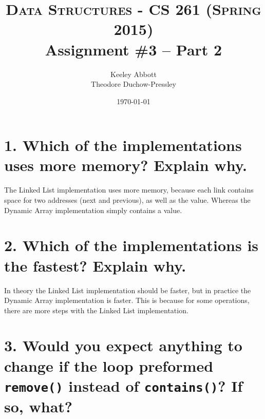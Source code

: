 \documentclass[letter,11pt]{scrartcl}
\title{
  \normalfont \normalsize
  \textsc{Data Structures - CS 261 (Spring 2015)} \\
  \huge Assignment \#3 -- Part 2
}
\author{Keeley Abbott
\\ Theodore Duchow-Pressley}
\date{\normalsize\today}
\begin{document}
\maketitle


\section*{1. Which of the implementations uses more memory? Explain why.}

The Linked List implementation uses more memory, because each link contains
space for two addresses (next and previous), as well as the value. Whereas the
Dynamic Array implementation simply contains a value.


\section*{2. Which of the implementations is the fastest? Explain why.}

In theory the Linked List implementation should be faster, but in practice the
Dynamic Array implementation is faster. This is because for some operations,
there are more steps with the Linked List implementation.


\section*{3. Would you expect anything to change if the loop preformed
  \texttt{remove()} instead of \texttt{contains()}? If so, what?}



\end{document}
